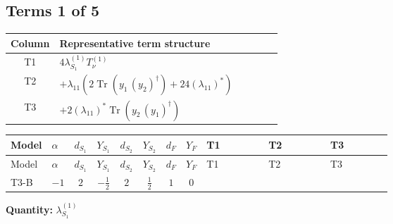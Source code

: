 \documentclass[8pt]{article}
\begin{document}
\begin{landscape}
\subsection*{Terms 1 of 5}
\begin{center}
\begin{tabular}{@{}c >{\raggedright\arraybackslash}p{0.82\linewidth}@{}}
\toprule
Column & Representative term structure \\
\midrule
T1 & \(\displaystyle 4 {\lambda_{S_1}^{(1)}} T_{\nu}^{(1)}\) \\
\midrule
T2 & \(\displaystyle +{\lambda_{11}} (2 \operatorname{Tr}\!\left({y_1}\,\left({y_2}\right)^{\dagger}\right)+24 \left({\lambda_{11}}\right)^{*})\) \\
\midrule
T3 & \(\displaystyle +2 \left({\lambda_{11}}\right)^{*} \operatorname{Tr}\!\left({y_2}\,\left({y_1}\right)^{\dagger}\right)\) \\
\midrule
\bottomrule
\end{tabular}
\end{center}
\smallskip
\tiny
\begin{longtable}{@{}llcccccc >{\raggedright\arraybackslash}p{0.21\linewidth} >{\raggedright\arraybackslash}p{0.21\linewidth} >{\raggedright\arraybackslash}p{0.21\linewidth}@{}}
\toprule
Model & $\alpha$ & $d_{S_1}$ & $Y_{S_1}$ & $d_{S_2}$ & $Y_{S_2}$ & $d_F$ & $Y_F$ & T1 & T2 & T3 \\
\midrule
\endfirsthead
\toprule
Model & $\alpha$ & $d_{S_1}$ & $Y_{S_1}$ & $d_{S_2}$ & $Y_{S_2}$ & $d_F$ & $Y_F$ & T1 & T2 & T3 \\
\midrule
\endhead
T3-B & $-1$ & $2$ & $-\frac{1}{2}$ & $2$ & $\frac{1}{2}$ & $1$ & $0$ & \scriptsize\adjustbox{max width=\linewidth}{$\begin{gathered} 4 {\lambda_{S_1}^{(1)}} T_{\nu}^{(1)}\end{gathered}$} & \scriptsize\adjustbox{max width=\linewidth}{$\begin{gathered} +{\lambda_{11}} (2 \operatorname{Tr}\!\left({y_1}\,\left({y_2}\right)^{\dagger}\right)+24 \left({\lambda_{11}}\right)^{*})\end{gathered}$} & \scriptsize\adjustbox{max width=\linewidth}{$\begin{gathered} +2 \left({\lambda_{11}}\right)^{*} \operatorname{Tr}\!\left({y_2}\,\left({y_1}\right)^{\dagger}\right)\end{gathered}$} \\
\midrule
\bottomrule
\end{longtable}
\clearpage
\noindent\textbf{Quantity: }$\lambda_{S_1}^{(1)}$\par\smallskip

\end{landscape}
\end{document}

